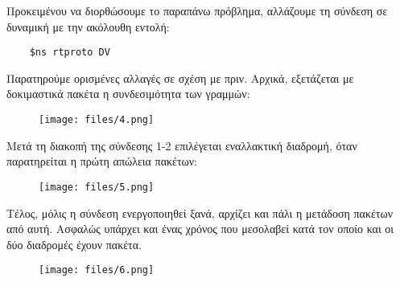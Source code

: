 \documentclass[a4paper,9pt]{article}
\begin{document}
Προκειμένου να διορθώσουμε το παραπάνω πρόβλημα, αλλάζουμε τη σύνδεση σε
δυναμική με την ακόλουθη εντολή:
\begin{verbatim}
    $ns rtproto DV
\end{verbatim}

Παρατηρούμε ορισμένες αλλαγές σε σχέση με πριν. Αρχικά, εξετάζεται με
δοκιμαστικά πακέτα η συνδεσιμότητα των γραμμών:
\begin{figure}[H]
    \centering
    \texttt{[image: files/4.png]}
\end{figure}

Μετά τη διακοπή της σύνδεσης 1-2 επιλέγεται εναλλακτική διαδρομή, όταν
παρατηρείται η πρώτη απώλεια πακέτων:

\begin{figure}[H]
    \centering
    \texttt{[image: files/5.png]}
\end{figure}

Τέλος, μόλις η σύνδεση ενεργοποιηθεί ξανά, αρχίζει και πάλι η μετάδοση πακέτων
από αυτή. Ασφαλώς υπάρχει και ένας χρόνος που μεσολαβεί κατά τον οποίο και οι
δύο διαδρομές έχουν πακέτα.

\begin{figure}[H]
    \centering
    \texttt{[image: files/6.png]}
\end{figure}
\end{document}
